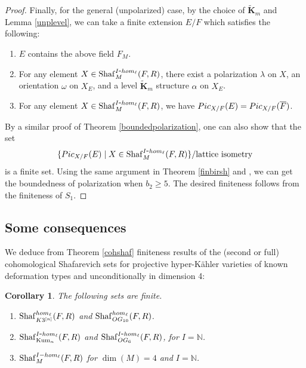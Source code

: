 \documentclass[11pt,reqno,oneside]{amsart}
\numberwithin{equation}{section}
\newtheorem{corollary}[theorem]{Corollary}
\theoremstyle{definition}
\newcommand{\Pic}{{\rm Pic}}
\renewcommand{\hom}{{\rm hom}}
\newcommand{\Sha}{\mathrm{Shaf}}
\newcommand{\NN}{\mathbb{N}}
\begin{document}
\begin{proof}
Finally, for the general (unpolarized) case, by the choice of $\widetilde{\mathbf{K}}_m$ and Lemma \ref{unplevel}, we can take a finite extension $E/F$ which satisfies the following:
\begin{enumerate}
\item
$E$ contains the above field $F_{M}$.
\item
For any element $X \in \Sha_M^{I\hbox{-}\hom_\ell}(F,R)$, there exist a polarization $\lambda$ on $X$, an orientation $\omega$ on $X_{E}$, and a level $\widetilde{\mathbf{K}}_m$ structure $\alpha$ on $X_{E}$.
 \item
 For any element $X \in \Sha_M^{I \hbox{-}\hom_\ell}(F,R)$, we have $\Pic_{X/F}(E) = \Pic_{X/F} (\overline{F})$.
\end{enumerate}
By a similar proof of Theorem \ref{boundedpolarization}, one can also show that
the set
\[
\{
\Pic_{X/F}(E) \mid X \in \Sha_M^{I \hbox{-}\hom_\ell}(F,R)
\}/ \text{lattice isometry}
\]
is a finite set.
Using the same argument in Theorem \ref{finbirsh} and \cite[Theorem 1.0.1]{takamatsu21}, we can get the boundedness of polarization when $b_2 \geq 5$. The desired finiteness follows from the finiteness of $S_{1}$.
\end{proof}



\subsection{Some consequences}
We deduce from Theorem \ref{cohshaf} finiteness results of the (second or full) cohomological Shafarevich sets for projective hyper-Kähler varieties of known deformation types and unconditionally in dimension 4:
\begin{corollary}
\label{cor:cohshaf}
The  following sets are finite.
\begin{enumerate}
    \item $\Sha_{K3^{[n]}}^{\hom_\ell}(F,R)$ and $\Sha_{OG_{10}}^{\hom_\ell}(F,R)$.
    \item  $\Sha_{\operatorname{Kum}_n}^{I \hbox{-}\hom_\ell}(F,R)$ and $\Sha_{OG_{6}}^{I \hbox{-}\hom_\ell}(F,R)$, for $I=\NN$.
    \item $\Sha_{M}^{I-\hom_\ell}(F,R)$ for $\dim(M)=4$ and $I=\mathbb{N}$.
\end{enumerate}
\end{corollary}
\end{document}
